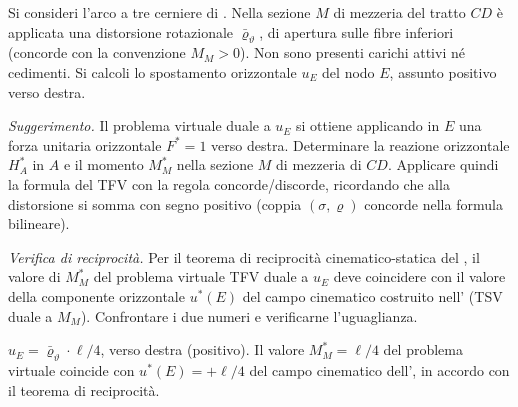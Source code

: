 \begin{esercizio}
	\label{ex:TFV_uE_arco}
	
	Si consideri l'arco a tre cerniere di
	. Nella sezione $M$ di mezzeria del
	tratto $CD$ è applicata una distorsione rotazionale 
	$\bar\varrho_\vartheta$, di apertura sulle fibre inferiori
	(concorde con la convenzione $M_M > 0$). Non sono presenti
	carichi attivi né cedimenti. Si calcoli lo spostamento
	orizzontale $u_E$ del nodo $E$, assunto positivo verso destra.
	
	\textit{Suggerimento.} Il problema virtuale duale a $u_E$ si
	ottiene applicando in $E$ una forza unitaria orizzontale
	$F^* = 1$ verso destra. Determinare la reazione orizzontale
	$H_A^*$ in $A$ e il momento $M_M^*$ nella sezione $M$ di
	mezzeria di $CD$. Applicare quindi la formula del TFV con la
	regola concorde/discorde, ricordando che alla distorsione si
	somma con segno positivo (coppia $(\sigma,\varrho)$ concorde
	nella formula bilineare).
	
	\textit{Verifica di reciprocità.} Per il teorema di
	reciprocità cinematico-statica del 
	, il valore di $M_M^*$ del problema
	virtuale TFV duale a $u_E$ deve coincidere con il valore della
	componente orizzontale $u^{*}(E)$ del campo cinematico
	costruito nell' (TSV duale a $M_M$).
	Confrontare i due numeri e verificarne l'uguaglianza.
	
	\risultato $u_E = \bar\varrho_\vartheta \cdot \ell/4$, verso
	destra (positivo). Il valore $M_M^* = \ell/4$ del problema
	virtuale coincide con $u^{*}(E) = +\ell/4$ del campo
	cinematico dell', in accordo con il
	teorema di reciprocità.
	
	
\end{esercizio}

